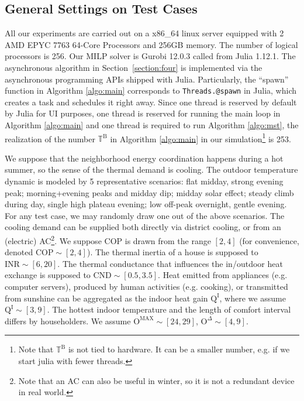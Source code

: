 \documentclass[journal]{IEEEtran}
\begin{document}
\subsection{General Settings on Test Cases}
All our experiments are carried out on a x86\_64 linux server equipped with
2 AMD EPYC 7763 64-Core Processors and 256GB memory.
The number of logical processors is 256.
Our MILP solver is Gurobi 12.0.3 called from Julia 1.12.1\cite{jump}.
The asynchronous algorithm in Section~\ref{section:four} is implemented
via the asynchronous programming APIs shipped with Julia.
Particularly, the ``spawn'' function in Algorithm \ref{algo:main}
corresponds to \texttt{Threads.@spawn} in Julia, which creates a task and schedules it right away.
Since one thread is reserved by default by Julia for UI purposes, one thread is reserved for running
the main loop in Algorithm \ref{algo:main} and one thread is required to run Algorithm \ref{algo:mst},
the realization of the number $\mathbb{T}^\mathrm{B}$ in Algorithm \ref{algo:main} in our simulation\footnote{Note that $\mathbb{T}^\mathrm{B}$ is not tied to hardware. It can be a smaller number, e.g. if we start julia with fewer threads.} is 253.
\par
We suppose that the neighborhood energy coordination happens during a hot summer, so the
sense of the thermal demand is cooling.
The outdoor temperature dynamic is modeled by 5 representative scenarios:
flat midday, strong evening peak; morning+evening peaks and midday dip;
midday solar effect; steady climb during day, single high plateau evening;
low off-peak overnight, gentle evening.
For any test case, we may randomly draw one out of the above scenarios.
The cooling demand can be supplied both directly via district cooling, or from 
an (electric) AC\footnote{Note that an AC can also be useful in winter, so it is not a redundant device in real world.}.
We suppose $\mathrm{COP}$ is drawn from the range $[2, 4]$ (for convenience, denoted
$\mathrm{COP} \sim [2, 4]$).
The thermal inertia of a house is supposed to $\mathrm{INR} \sim [6, 20]$.
The thermal conductance that influences the in/outdoor heat exchange is supposed to
$\mathrm{CND} \sim [0.5, 3.5]$.
Heat emitted from appliances (e.g. computer servers), produced by human activities (e.g. cooking),
or transmitted from sunshine can be aggregated as the indoor heat gain $\mathrm{Q}^\mathrm{I}$,
where we assume $\mathrm{Q}^\mathrm{I} \sim [3, 9]$.
The hottest indoor temperature and the length of comfort interval differs by householders.
We assume $\mathrm{O}^\text{MAX} \sim [24, 29]$, $\mathrm{O}^\Delta \sim [4, 9]$.
\end{document}
